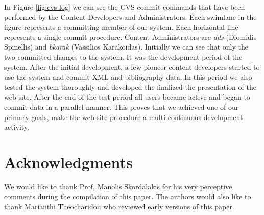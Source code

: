 \documentclass[10pt]{article}
\begin{document}
In Figure \ref{fig:cvs-log} we can see the {\sc CVS} commit commands that have been performed by
the Content Developers and Administrators. Each swimlane in the figure represents a committing
member of our system. Each horizontal line represents a single commit procedure. Content Administrators
are \textit{dds} (Diomidis Spinellis) and \textit{bkarak} (Vassilios Karakoidas). Initially we can see that only the two committed 
changes to the system. It was the development period of the system. After the initial development, a few 
pioneer content developers started to use the system and commit {\sc XML} and bibliography data. In this period 
we also tested the system thoroughly and developed the finalized the presentation of the web site. After the end of
the test period all users became active and began to commit data in a parallel manner. This proves that we achieved 
one of our primary goals, make the web site procedure a multi-continuous development activity.

\section{Acknowledgments}
\label{sec:ack}

We would like to thank Prof. Manolis Skordalakis for his very perceptive comments during the compilation of this paper.
The authors would also like to thank Marianthi Theocharidou who reviewed early versions 
of this paper.



\end{document}
